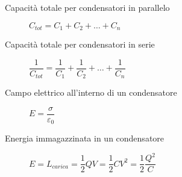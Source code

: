 \documentclass[a4paper,11pt,italian]{article}
\begin{document}
\begin{description}
  \item[Capacità totale per condensatori in parallelo] 
  $ C_{tot} = C_1 + C_2 + \ldots + C_n $ 
%

  \item[Capacità totale per condensatori in serie] 
  $ \dfrac{1}{C_{tot}} = \dfrac{1}{C_1} + \dfrac{1}{C_2} + \ldots + \dfrac{1}{C_n}  $
%   
  
  \item[Campo elettrico all'interno di un condensatore]
  $ E = \dfrac{\sigma}{\varepsilon_0} $
  
  \item[Energia immagazzinata in un condensatore]
  $ E = L_{carica} = \dfrac{1}{2} QV = \dfrac{1}{2} CV^2 = \dfrac{1}{2} \dfrac{Q^2}{C} $
\end{description}
\end{document}
